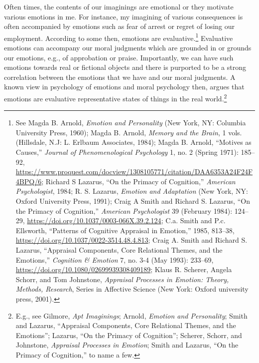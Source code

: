 \documentclass[phdthesis,12pt,final,a4paper]{wuthesis}
\theoremstyle{definition}
\theoremstyle{definition}
\theoremstyle{definition}
\theoremstyle{definition}
\theoremstyle{remark}
\begin{document}
Often times, the contents of our imaginings are emotional or they motivate various emotions in me. For instance, my imagining of various consequences is often accompanied by emotions such as fear of arrest or regret of losing our employment. According to some then, emotions are evaluative.\footnote{See Magda B. Arnold, \emph{Emotion and {Personality}} (New York, NY: Columbia University Press, 1960); Magda B. Arnold, \emph{Memory and the Brain}, 1 vols. (Hillsdale, N.J: L. Erlbaum Associates, 1984); Magda B. Arnold, {``Motives as Causes,''} \emph{Journal of Phenomenological Psychology} 1, no. 2 (Spring 1971): 185--92, \url{https://www.proquest.com/docview/1308105771/citation/DAA6353A24F24F4BPQ/6}; Richard S Lazarus, {``On the {Primacy} of {Cognition},''} \emph{American Psychologist}, 1984; R. S. Lazarus, \emph{Emotion and Adaptation} (New York, NY: Oxford University Press, 1991); Craig A Smith and Richard S. Lazarus, {``On the {Primacy} of {Cognition},''} \emph{American Psychologist} 39 (February 1984): 124--29, \url{https://doi.org/10.1037/0003-066X.39.2.124}; C.a. Smith and P.c. Ellsworth, {``Patterns of {Cognitive Appraisal} in {Emotion},''} 1985, 813--38, \url{https://doi.org/10.1037/0022-3514.48.4.813}; Craig A. Smith and Richard S. Lazarus, {``Appraisal {Components}, {Core Relational Themes}, and the {Emotions},''} \emph{Cognition \& Emotion} 7, no. 3-4 (May 1993): 233--69, \url{https://doi.org/10.1080/02699939308409189}; Klaus R. Scherer, Angela Schorr, and Tom Johnstone, \emph{Appraisal Processes in Emotion: Theory, Methods, Research}, Series in Affective Science (New York: Oxford university press, 2001).} Evaluative emotions can accompany our moral judgments which are grounded in or grounds our emotions, e.g., of approbation or praise. Importantly, we can have such emotions towards real or fictional objects and there is purported to be a strong correlation between the emotions that we have and our moral judgments. A known view in psychology of emotions and moral psychology then, argues that emotions are evaluative representative states of things in the real world.\footnote{E.g., see Gilmore, \emph{Apt {Imaginings}}; Arnold, \emph{Emotion and {Personality}}; Smith and Lazarus, {``Appraisal {Components}, {Core Relational Themes}, and the {Emotions}''}; Lazarus, {``On the {Primacy} of {Cognition}''}; Scherer, Schorr, and Johnstone, \emph{Appraisal Processes in Emotion}; Smith and Lazarus, {``On the {Primacy} of {Cognition},''} to name a few.}
\end{document}
